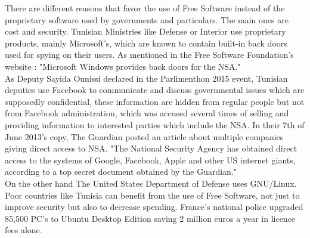 \newpage
 

\vspace*{-55mm}

\begin{multicols}{2}

There are different reasons that favor the use of Free Software instead of the proprietary software used by governments and particulars. The main ones are cost and security.
Tunisian Ministries like Defense or Interior use proprietary products, mainly Microsoft's, which are known to contain built-in back doors used for spying on their users. As mentioned in the Free Software Foundation's website : "Microsoft Windows provides back doors for the NSA."\\

As Deputy Sayida Ounissi declared in the Parlimenthon 2015 event, Tunisian deputies use Facebook to communicate and discuss governmental issues which are supposedly confidential, these information are hidden from regular people but not from Facebook administration, which was accused several times of selling and providing information to interested parties which include the NSA. In their 7th of June 2013's copy, The Guardian posted an article about multiple companies giving direct access to NSA. "The National Security Agency has obtained direct access to the systems of Google, Facebook, Apple and other US internet giants, according to a top secret document obtained by the Guardian."\\

On the other hand The United States Department of Defense uses GNU/Linux.\\

Poor countries like Tunisia can benefit from the use of Free Software, not just to improve security but also to decrease spending. France's national police upgraded 85,500 PC's to Ubuntu Desktop Edition saving 2 million euros a year in licence fees alone.


\end{multicols}

